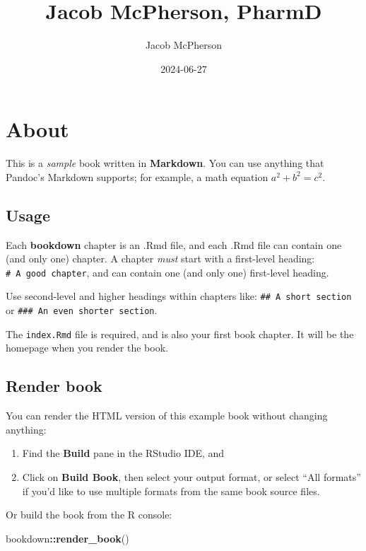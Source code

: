 \documentclass[
]{book}
\title{Jacob McPherson, PharmD}
\author{Jacob McPherson}
\date{2024-06-27}
\newenvironment{Shaded}{\begin{snugshade}}{\end{snugshade}}
\newcommand{\FunctionTok}[1]{\textcolor[rgb]{0.13,0.29,0.53}{\textbf{#1}}}
\newcommand{\NormalTok}[1]{#1}
\newcommand{\SpecialCharTok}[1]{\textcolor[rgb]{0.81,0.36,0.00}{\textbf{#1}}}
\begin{document}
\maketitle

{
\setcounter{tocdepth}{1}
\tableofcontents
}
\chapter{About}\label{about}

This is a \emph{sample} book written in \textbf{Markdown}. You can use anything that Pandoc's Markdown supports; for example, a math equation \(a^2 + b^2 = c^2\).

\section{Usage}\label{usage}

Each \textbf{bookdown} chapter is an .Rmd file, and each .Rmd file can contain one (and only one) chapter. A chapter \emph{must} start with a first-level heading: \texttt{\#\ A\ good\ chapter}, and can contain one (and only one) first-level heading.

Use second-level and higher headings within chapters like: \texttt{\#\#\ A\ short\ section} or \texttt{\#\#\#\ An\ even\ shorter\ section}.

The \texttt{index.Rmd} file is required, and is also your first book chapter. It will be the homepage when you render the book.

\section{Render book}\label{render-book}

You can render the HTML version of this example book without changing anything:

\begin{enumerate}
\def\labelenumi{\arabic{enumi}.}
\item
  Find the \textbf{Build} pane in the RStudio IDE, and
\item
  Click on \textbf{Build Book}, then select your output format, or select ``All formats'' if you'd like to use multiple formats from the same book source files.
\end{enumerate}

Or build the book from the R console:

\begin{Shaded}
\begin{Highlighting}[]
\NormalTok{bookdown}\SpecialCharTok{::}\FunctionTok{render\_book}\NormalTok{()}
\end{Highlighting}
\end{Shaded}
\end{document}
